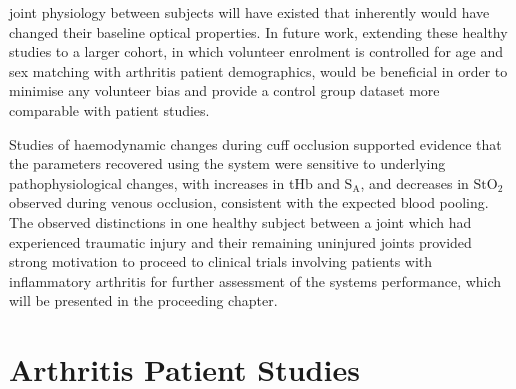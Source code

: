 \documentclass[twoside]{bhamthesis}
\theoremstyle{definition}
\begin{document}
joint physiology between subjects will have existed that inherently would have changed their baseline optical properties. In future work, extending these healthy studies to a larger cohort, in which volunteer enrolment is controlled for age and sex matching with arthritis patient demographics, would be beneficial in order to minimise any volunteer bias and provide a control group dataset more comparable with patient studies.

Studies of haemodynamic changes during cuff occlusion supported evidence that the parameters recovered using the system were sensitive to underlying pathophysiological changes, with increases in tHb and $\mathrm{S_A}$, and decreases in  $\mathrm{StO_2}$ observed during venous occlusion, consistent with the expected blood pooling. The observed distinctions in one healthy subject between a joint which had experienced traumatic injury and their remaining uninjured joints provided strong motivation to proceed to clinical trials involving patients with inflammatory arthritis for further assessment of the systems performance, which will be presented in the proceeding chapter.




\chapter{Arthritis Patient Studies}
\label{chapter:Arthritis}
 
\end{document}
